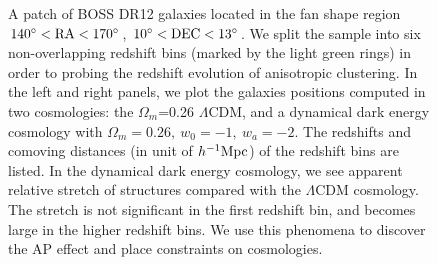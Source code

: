 \documentclass[iop]{emulateapj}
\begin{document}
\begin{figure}
   \caption{\label{fig_fan}
   A patch of BOSS DR12 galaxies located in the fan shape region $\rm 140^\circ < RA < 170 ^\circ$, $\rm 10^\circ < DEC < 13 ^\circ$.
   We split the sample into six non-overlapping redshift bins
   (marked by the light green rings) in order to probing the redshift evolution of anisotropic clustering.
   In the left and right panels, we plot the galaxies positions computed in two cosmologies: the $\Omega_m$=0.26 $\Lambda$CDM, 
   and a dynamical dark energy cosmology with $\Omega_m=0.26,\ w_0=-1,\ w_a=-2$.
   The redshifts and comoving distances (in unit of $h^{-1}\rm Mpc$) of the redshift bins are listed.
   In the dynamical dark energy cosmology, we see apparent relative stretch of structures compared with the $\Lambda$CDM cosmology.
   The stretch is not significant in the first redshift bin, and becomes large in the higher redshift bins.
   We use this phenomena to discover the AP effect and place constraints on cosmologies.
   }
\end{figure}
\end{document}
